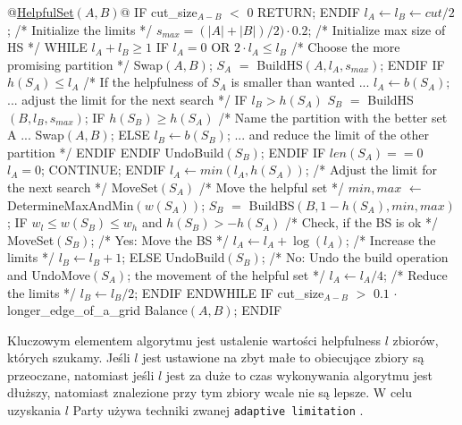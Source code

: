 \newpage

\begin{pseudocode}
@\underline{HelpfulSet$(A,B)$}@
  IF cut_size$_{A-B}$ $<$ $0$
    RETURN;
  ENDIF
  $l_A \leftarrow l_B \leftarrow cut/2$;                        /* Initialize the limits */
  $s_{max} = (|A| + |B|) / 2) \cdot 0.2$;                /* Initialize max size of HS */
  WHILE $l_A + l_B \geq 1$
    IF $l_A = 0$ OR $2 \cdot l_A \leq l_B$  /* Choose the more promising partition */
      Swap$(A,B)$;
    $S_A$ $=$ BuildHS$(A, l_A, s_{max})$;
    ENDIF
    IF $h(S_A) \leq l_A$ /* If the helpfulness of $S_A$ is smaller than wanted ...
      $l_A \leftarrow b(S_A)$;          ... adjust the limit for the next search */
      IF $l_B > h(S_A)$
        $S_B$ $=$ BuildHS$(B, l_B, s_{max})$;
        IF $h(S_B) \geq h(S_A)$ /* Name the partition with the better set A ...
          Swap$(A, B)$;
        ELSE
          $l_B \leftarrow b(S_B)$; ... and reduce the limit of the other partition */
        ENDIF
      ENDIF
      UndoBuild$(S_B)$;
    ENDIF
    IF $len(S_A) == 0$
      $l_A = 0$;
      CONTINUE;
    ENDIF
    $l_A \leftarrow min(l_A,h(S_A))$;          /* Adjust the limit for the next search */
    MoveSet$(S_A)$                             /* Move the helpful set */
    $min, max$ $\leftarrow$ DetermineMaxAndMin$(w(S_A))$;
    $S_B$ $=$ BuildBS$(B,1 - h(S_A),min,max)$;
    IF $w_l \leq w(S_B) \leq w_h$ and $h(S_B) > -h(S_A)$  /* Check, if the BS is ok */
      MoveSet$(S_B)$;                       /* Yes: Move the BS */
      $l_A \leftarrow l_A + \log(l_A)$;                  /* Increase the limits */
      $l_B \leftarrow l_B + 1$;
    ELSE
      UndoBuild$(S_B)$;           /* No: Undo the build operation and
      UndoMove$(S_A)$;              the movement of the helpful set */
      $l_A \leftarrow l_A/4$;                            /* Reduce the limits */
      $l_B \leftarrow l_B/2$;
    ENDIF
  ENDWHILE
  IF cut_size$_{A-B}$ $>$ $0.1$ $\cdot$ longer_edge_of_a_grid
    Balance$(A, B)$;
  ENDIF
\end{pseudocode}
\vspace{-8mm}
\label{code:helpful_sets}
\newpage
Kluczowym elementem algorytmu jest ustalenie wartości helpfulness $l$ zbiorów, których szukamy.
Jeśli $l$ jest ustawione na zbyt małe to obiecujące zbiory są przeoczane, natomiast jeśli $l$ jest za duże
to czas wykonywania algorytmu jest dłuższy, natomiast znalezione przy tym zbiory wcale nie są lepsze.
W celu uzyskania $l$ Party używa techniki zwanej \texttt{adaptive limitation} \cite{article}.
